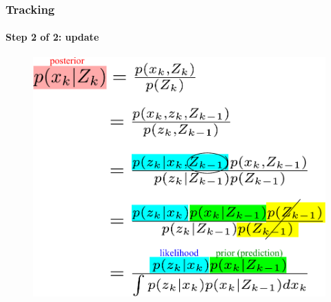 


\begin{frame}
\frametitle{Tracking}
\framesubtitle{Step 2 of 2: update}
\logoCSIPCPL\mypagenum
\begin{figure}
\includegraphics[width=1.0\textwidth]{thesis/TRK_EQN_update.pdf}
\end{figure}
\end{frame}




